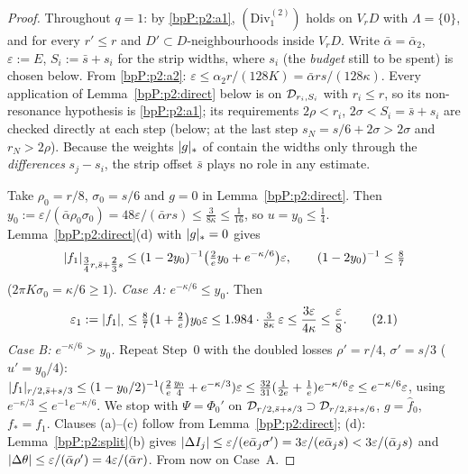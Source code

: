 \begin{proof}
Throughout $q=1$: by \ref{bpP:p2:a1}, $(\mathrm{Div}^{(2)}_1)$ holds on $V_rD$ with $\Lambda=\{0\}$, and for every $r'\le r$ and $D'\subset D$-neighbourhoods inside $V_rD$. Write $\bar\alpha=\bar\alpha_2$, $\varepsilon:=E$, $S_i:=\bar s+s_i$ for the strip widths, where $s_i$ (the \emph{budget} still to be spent) is chosen below.
From \ref{bpP:p2:a2}: $\varepsilon\le\alpha_2r/(128K)=\bar\alpha rs/(128\kappa)$. Every application of Lemma~\ref{bpP:p2:direct} below is on $\mathcal D_{r_i,S_i}$ with $r_i\le r$, so its non-resonance hypothesis is \ref{bpP:p2:a1}; its requirements $2\rho<r_i$, $2\sigma<S_i=\bar s+s_i$ are checked directly at each step (below; at the last step $s_N=s/6+2\sigma>2\sigma$ and $r_N>2\rho$).
Because the weights $\lvert g\rvert_*$ of  contain the widths only through the \emph{differences} $s_j-s_i$, the strip offset $\bar s$ plays no role in any estimate.

\label{stepP:p2:nfb-first} Take $\rho_0=r/8$, $\sigma_0=s/6$ and $g=0$ in Lemma~\ref{bpP:p2:direct}. Then $y_0:=\varepsilon/(\bar\alpha\rho_0\sigma_0)=48\varepsilon/(\bar\alpha rs)\le\frac{3}{8\kappa}\le\frac1{16}$, so $u=y_0\le\frac14$. Lemma~\ref{bpP:p2:direct}(d) with $\lvert g\rvert_*=0$ gives
\[\lvert f_1\rvert_{\tfrac34r,\bar s+\tfrac23s}\le(1-2y_0)^{-1}\bigl(\tfrac2ey_0+e^{-\kappa/6}\bigr)\varepsilon,\qquad(1-2y_0)^{-1}\le\tfrac87\]
($2\pi K\sigma_0=\kappa/6\ge1$).
\emph{Case A: $e^{-\kappa/6}\le y_0$.} Then
\[\varepsilon_1:=\lvert f_1\rvert_{,}\le\tfrac87\bigl(1+\tfrac2e\bigr)y_0\varepsilon\le1.984\cdot\tfrac3{8\kappa}\,\varepsilon\le\frac{3\varepsilon}{4\kappa}\le\frac\varepsilon8.\tag{2.1}\]
\emph{Case B: $e^{-\kappa/6}>y_0$.} Repeat Step~0 with the doubled losses $\rho'=r/4$, $\sigma'=s/3$ ($u'=y_0/4$): $\lvert f_1\rvert_{r/2,\bar s+s/3}\le(1-y_0/2)^{-1}(\tfrac2e\tfrac{y_0}4+e^{-\kappa/3})\varepsilon\le\tfrac{32}{31}(\tfrac1{2e}+\tfrac1e)e^{-\kappa/6}\varepsilon\le e^{-\kappa/6}\varepsilon$, using $e^{-\kappa/3}\le e^{-1}e^{-\kappa/6}$. We stop with $\Psi=\Phi_0'$ on $\mathcal D_{r/2,\bar s+s/3}\supset\mathcal D_{r/2,\bar s+s/6}$, $g=\hat f_0$, $f_*=f_1$. Clauses (a)--(c) follow from Lemma~\ref{bpP:p2:direct}; (d): Lemma~\ref{bpP:p2:split}(b) gives $\lvert \Delta I_j\rvert\le\varepsilon/(e\bar\alpha_j\sigma')=3\varepsilon/(e\bar\alpha_js)<3\varepsilon/(\bar\alpha_js)$ and $\lvert \Delta\theta\rvert\le\varepsilon/(\bar\alpha\rho')=4\varepsilon/(\bar\alpha r)$.
From now on Case~A.


\end{proof}
